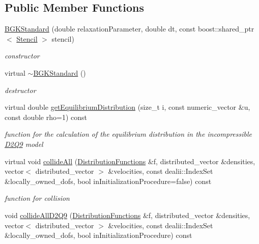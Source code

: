 \subsection*{Public Member Functions}
\begin{DoxyCompactItemize}
\item 
\hypertarget{classnatrium_1_1BGKStandard_a4c2b17997ae6e88b1d6be7b93f210fe7}{
\hyperlink{classnatrium_1_1BGKStandard_a4c2b17997ae6e88b1d6be7b93f210fe7}{BGKStandard} (double relaxationParameter, double dt, const boost::shared\_\-ptr$<$ \hyperlink{classnatrium_1_1Stencil}{Stencil} $>$ stencil)}
\label{classnatrium_1_1BGKStandard_a4c2b17997ae6e88b1d6be7b93f210fe7}

\begin{DoxyCompactList}\small\item\em constructor \item\end{DoxyCompactList}\item 
virtual \hyperlink{classnatrium_1_1BGKStandard_aa55035be79098a762cf4f0ef308d41e5}{$\sim$BGKStandard} ()
\begin{DoxyCompactList}\small\item\em destructor \item\end{DoxyCompactList}\item 
virtual double \hyperlink{classnatrium_1_1BGKStandard_a3d45ef2fe5536bf14914f99297477754}{getEquilibriumDistribution} (size\_\-t i, const numeric\_\-vector \&u, const double rho=1) const 
\begin{DoxyCompactList}\small\item\em function for the calculation of the equilibrium distribution in the incompressible \hyperlink{classnatrium_1_1D2Q9}{D2Q9} model \item\end{DoxyCompactList}\item 
virtual void \hyperlink{classnatrium_1_1BGKStandard_a8e0493b063d56275d7ee607e25c4145e}{collideAll} (\hyperlink{classnatrium_1_1DistributionFunctions}{DistributionFunctions} \&f, distributed\_\-vector \&densities, vector$<$ distributed\_\-vector $>$ \&velocities, const dealii::IndexSet \&locally\_\-owned\_\-dofs, bool inInitializationProcedure=false) const 
\begin{DoxyCompactList}\small\item\em function for collision \item\end{DoxyCompactList}\item 
\hypertarget{classnatrium_1_1BGKStandard_aaaad49afea2e7079645b49380d990254}{
void \hyperlink{classnatrium_1_1BGKStandard_aaaad49afea2e7079645b49380d990254}{collideAllD2Q9} (\hyperlink{classnatrium_1_1DistributionFunctions}{DistributionFunctions} \&f, distributed\_\-vector \&densities, vector$<$ distributed\_\-vector $>$ \&velocities, const dealii::IndexSet \&locally\_\-owned\_\-dofs, bool inInitializationProcedure) const }
\label{classnatrium_1_1BGKStandard_aaaad49afea2e7079645b49380d990254}


\end{DoxyCompactItemize}
